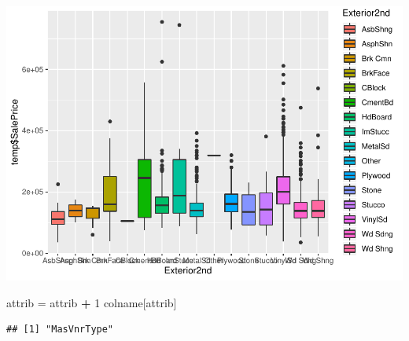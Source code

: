 \documentclass[]{article}
\newenvironment{Shaded}{\begin{snugshade}}{\end{snugshade}}
\newcommand{\DecValTok}[1]{\textcolor[rgb]{0.00,0.00,0.81}{#1}}
\newcommand{\StringTok}[1]{\textcolor[rgb]{0.31,0.60,0.02}{#1}}
\newcommand{\OperatorTok}[1]{\textcolor[rgb]{0.81,0.36,0.00}{\textbf{#1}}}
\newcommand{\NormalTok}[1]{#1}
\begin{document}
\includegraphics{EDA_files/figure-latex/unnamed-chunk-47-1.pdf}

\begin{Shaded}
\begin{Highlighting}[]
\NormalTok{attrib =}\StringTok{ }\NormalTok{attrib }\OperatorTok{+}\StringTok{ }\DecValTok{1}
\NormalTok{colname[attrib]}
\end{Highlighting}
\end{Shaded}

\begin{verbatim}
## [1] "MasVnrType"
\end{verbatim}
\end{document}
